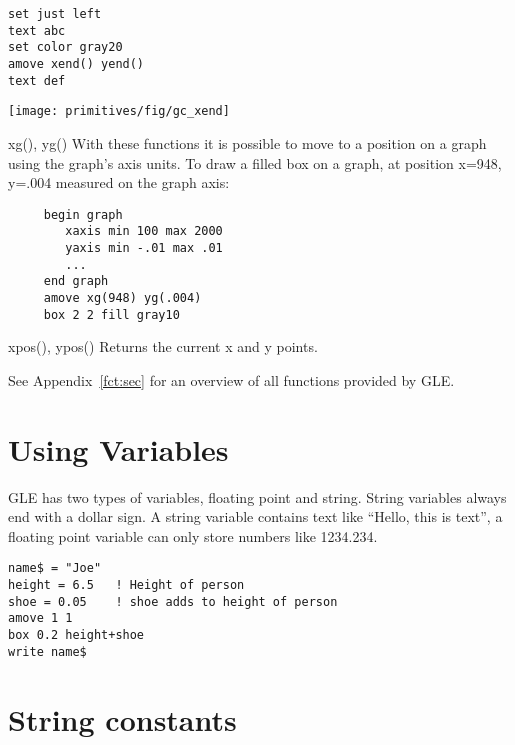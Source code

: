 \begin{commanddescription}
\begin{minipage}[c]{8cm}
\begin{Verbatim}
set just left
text abc
set color gray20 
amove xend() yend() 
text def            
\end{Verbatim}
\end{minipage}
\hfill
\begin{minipage}[c]{7cm}
\mbox{\texttt{[image: primitives/fig/gc\_xend]}}
\end{minipage}

\item[{\sf xg(), yg()}]
 
With these functions it is possible to move to a position on a graph
using the graph's axis units.
To draw a filled box on a graph, at position x=948, y=.004  measured
on the graph axis:

\preglecode{}
\begin{Verbatim}
     begin graph
        xaxis min 100 max 2000
        yaxis min -.01 max .01
        ...
     end graph
     amove xg(948) yg(.004)
     box 2 2 fill gray10
\end{Verbatim}
\postglecode{}

\item[{\sf xpos(), ypos()}]
 
Returns the current x and y points.
\end{commanddescription}

\noindent{}See Appendix~\ref{fct:sec} for an overview of all functions provided by GLE.

\section{Using Variables}

GLE has two types of variables,  floating point and string. String 
variables always end with a dollar sign.  A string variable contains
text like ``Hello, this is text'', a floating point variable can
only store numbers like 1234.234.

\preglecode{}
\begin{Verbatim}
name$ = "Joe"
height = 6.5   ! Height of person
shoe = 0.05    ! shoe adds to height of person
amove 1 1
box 0.2 height+shoe
write name$
\end{Verbatim}
\postglecode{}

\section{String constants}


